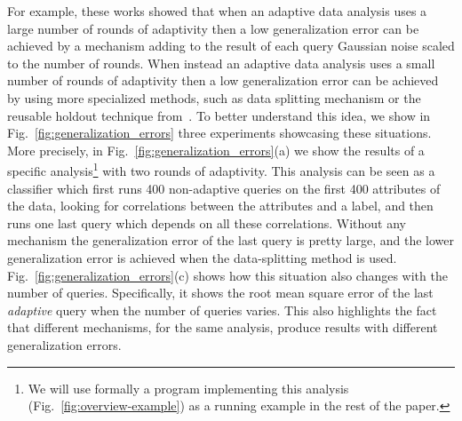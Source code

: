 For example, these works showed that when an adaptive data analysis uses a large number of rounds of adaptivity then a low generalization error can be achieved by a mechanism  
adding to the result of each query Gaussian noise scaled to the number of rounds. When instead  an adaptive data analysis uses a small number of rounds of adaptivity then a low generalization error can be achieved by using more specialized methods, such as data splitting mechanism or the reusable holdout technique from~\citet{DworkFHPRR15}.
To better understand this idea, we show in Fig.~\ref{fig:generalization_errors} three experiments showcasing these situations. More precisely, in Fig.~\ref{fig:generalization_errors}(a) we show the results of a specific analysis\footnote{We will use formally a program implementing this analysis (Fig.~\ref{fig:overview-example}) as a running example in the rest of the paper.} with two rounds of adaptivity. This analysis can be seen as a classifier which first runs 400 non-adaptive queries on the first 400 attributes of the data, looking for correlations between the attributes and a label, and then runs one last query which depends on all these correlations. Without any mechanism the generalization error of the last query is pretty large, and the lower generalization error is achieved when the data-splitting method is used. Fig.~\ref{fig:generalization_errors}(c) shows how this situation also changes with the number of queries. Specifically, it shows the root mean square error of the last \emph{adaptive} query when the number of queries varies. This also highlights the fact that different mechanisms, for the same analysis, produce results with different generalization errors.
